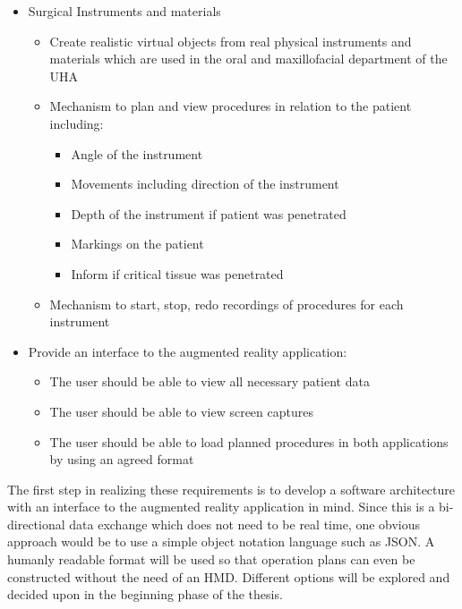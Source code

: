 \begin{itemize}
\begin{itemize}
        \end{itemize}
    \item Surgical Instruments and materials
        \begin{itemize}
            \item Create realistic virtual objects from real physical instruments and materials which are used in the oral and maxillofacial department of the UHA
            \item Mechanism to plan and view procedures in relation to the patient including:          
                \begin{itemize}
                    \item Angle of the instrument
                    \item Movements including direction of the instrument
                    \item Depth of the instrument if patient was penetrated
                    \item Markings on the patient
                    \item Inform if critical tissue was penetrated
                \end{itemize}
            \item Mechanism to start, stop, redo recordings of procedures for each instrument
        \end{itemize}
    \item Provide an interface to the augmented reality application:
        \begin{itemize}
            \item The user should be able to view all necessary patient data
            \item The user should be able to view screen captures
            \item The user should be able to load planned procedures in both applications by using an agreed format
        \end{itemize}
\end{itemize}

The first step in realizing these requirements is to develop a software architecture with an interface to the augmented reality application in mind.
Since this is a bi-directional data exchange which does not need to be real time, one obvious approach would be to use a simple object notation language such as JSON.
A humanly readable format will be used so that operation plans can even be constructed without the need of an HMD.
Different options will be explored and decided upon in the beginning phase of the thesis.

